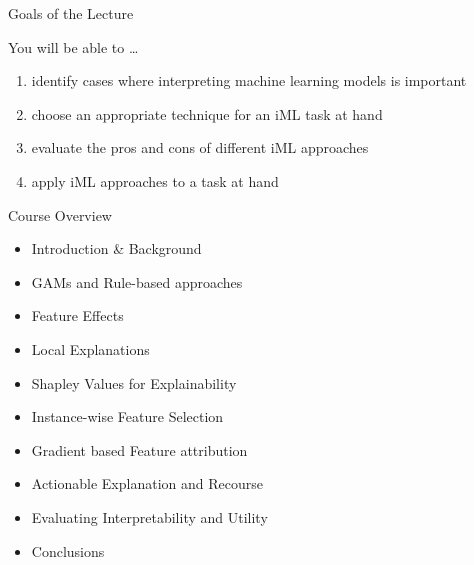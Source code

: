 \documentclass[aspectratio=169]{../latex_main/tntbeamer}  %
\begin{document}
\begin{frame}[c]{Goals of the Lecture}

You will be able to \ldots
\begin{enumerate}
  \item \alert{identify} cases where interpreting machine learning models is important
  \item \alert{choose} an appropriate technique for an iML task at hand
  \item \alert{evaluate} the pros and cons of different iML approaches
  \item \alert{apply} iML approaches to a task at hand
\end{enumerate}

\end{frame}
\begin{frame}[c]{Course Overview}

\begin{itemize}
	\item Introduction \& Background 
	\item GAMs and Rule-based approaches 
	\item Feature Effects
	\item Local Explanations
	\item Shapley Values for Explainability
	\item Instance-wise Feature Selection
	\item Gradient based Feature attribution
	\item Actionable Explanation and Recourse
	\item Evaluating Interpretability and Utility
	\item Conclusions 
\end{itemize}


\end{frame}
\end{document}
